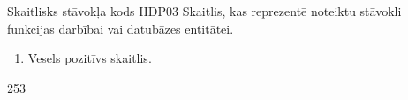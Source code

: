 {Skaitlisks stāvokļa kods}
{IIDP03}
{
	Skaitlis, kas reprezentē noteiktu stāvokli funkcijas darbībai vai datubāzes entitātei.
}
{
	\begin{enumerate}
		\item Vesels pozitīvs skaitlis.
	\end{enumerate}
}
{
	253
}
